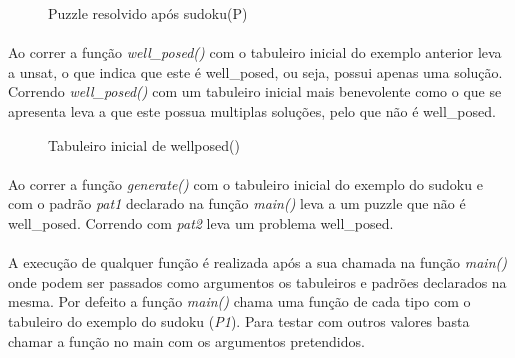 \documentclass[a4paper,12pt]{article}
\begin{document}
\begin{figure}
	\caption{Puzzle resolvido após sudoku(P)}
	\centering
	\begin{sudoku}[scale=.5]
	\end{sudoku}
\end{figure}

\paragraph{}
Ao correr a função {\it well\_posed()} com o tabuleiro inicial do exemplo anterior leva a unsat, o que indica que este é well\_posed, ou seja, possui apenas uma solução. Correndo {\it well\_posed()} com um tabuleiro inicial mais benevolente como o que se apresenta leva a que este possua multiplas soluções, pelo que não é well\_posed.


\begin{figure}
	\caption{Tabuleiro inicial de well\textunderscore posed()}
	\centering
	\begin{sudoku}[scale=.5]
	\end{sudoku}
\end{figure}

\paragraph{}
Ao correr a função {\it generate()} com o tabuleiro inicial do exemplo do sudoku e com o padrão {\it pat1} declarado na função {\it main()} leva a um puzzle que não é well\_posed. Correndo com {\it pat2} leva um problema well\_posed.

\paragraph{}
A execução de qualquer função é realizada após a sua chamada na função {\it main()} onde podem ser passados como argumentos os tabuleiros e padrões declarados na mesma. Por defeito a função {\it main()} chama uma função de cada tipo com o tabuleiro do exemplo do sudoku ({\it P1}). Para testar com outros valores basta chamar a função no main com os argumentos pretendidos.

\subsection{}
\end{document}
